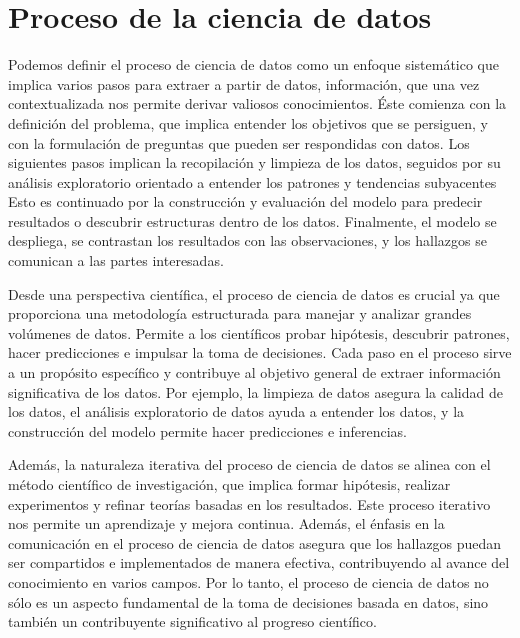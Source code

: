 \section{Proceso de la ciencia de datos}
Podemos definir el proceso de ciencia de datos como un enfoque sistemático que implica varios pasos para extraer a partir de datos, información, que una vez contextualizada nos permite derivar valiosos conocimientos. Éste comienza con la definición del problema, que implica entender los objetivos que se persiguen, y con la formulación de preguntas que pueden ser respondidas con datos. Los siguientes pasos implican la recopilación y limpieza de los datos, seguidos por su análisis exploratorio orientado a entender los patrones y tendencias subyacentes Esto es continuado por la construcción y evaluación del modelo para predecir resultados o descubrir estructuras dentro de los datos. Finalmente, el modelo se despliega, se contrastan los resultados con las observaciones, y los hallazgos se comunican a las partes interesadas.\par

Desde una perspectiva científica, el proceso de ciencia de datos es crucial ya que proporciona una metodología estructurada para manejar y analizar grandes volúmenes de datos. Permite a los científicos probar hipótesis, descubrir patrones, hacer predicciones e impulsar la toma de decisiones. Cada paso en el proceso sirve a un propósito específico y contribuye al objetivo general de extraer información significativa de los datos. Por ejemplo, la limpieza de datos asegura la calidad de los datos, el análisis exploratorio de datos ayuda a entender los datos, y la construcción del modelo permite hacer predicciones e inferencias.\par

Además, la naturaleza iterativa del proceso de ciencia de datos se alinea con el método científico de investigación, que implica formar hipótesis, realizar experimentos y refinar teorías basadas en los resultados. Este proceso iterativo nos permite un aprendizaje y mejora continua. Además, el énfasis en la comunicación en el proceso de ciencia de datos asegura que los hallazgos puedan ser compartidos e implementados de manera efectiva, contribuyendo al avance del conocimiento en varios campos. Por lo tanto, el proceso de ciencia de datos no sólo es un aspecto fundamental de la toma de decisiones basada en datos, sino también un contribuyente significativo al progreso científico.\par

